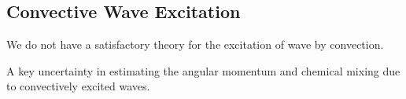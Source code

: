 {\color{purple}
\subsection{Convective Wave Excitation}
}

We do not have a satisfactory theory for the excitation of wave by convection.  

A key uncertainty in estimating the angular momentum and chemical mixing due to convectively excited waves.
